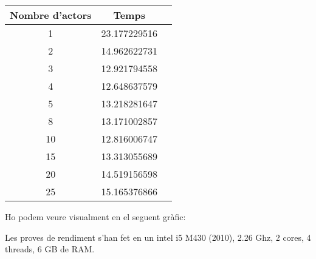 \documentclass{report}
\begin{document}
\begin{center}
\begin{tabular}{| c | c | c |}
\hline
Nombre d'actors  & Temps \\ \hline
1  & 23.177229516 \\ \hline
2  & 14.962622731 \\ \hline
3  & 12.921794558 \\ \hline
4  & 12.648637579 \\ \hline
5  & 13.218281647 \\ \hline
8  & 13.171002857 \\ \hline
10 & 12.816006747 \\ \hline
15 & 13.313055689 \\ \hline
20 & 14.519156598 \\ \hline
25 & 15.165376866 \\
\hline
\end{tabular}
\end{center}

Ho podem veure visualment en el seguent gràfic:

\begin{center}
\end{center}


Les proves de rendiment s'han fet en un intel i5 M430 (2010), 2.26 Ghz, 2 cores, 4 threads, 6 GB de RAM.
\end{document}
